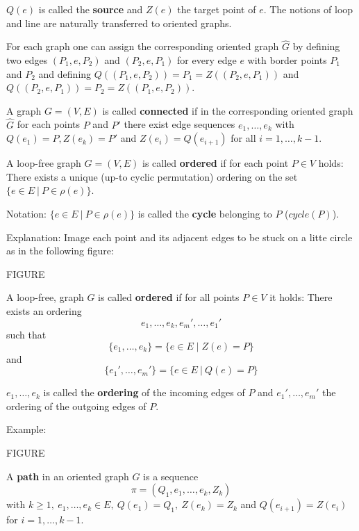 $Q(e)$ is called the {\bf source} and $Z(e)$ the target point of $e$. The
notions of loop and line are naturally transferred to oriented graphs.

For each graph one can assign the corresponding oriented graph $\hat{G}$ by
defining two edges $(P_1,e,P_2)$ and $(P_2,e,P_1)$ for every edge $e$ with border points
$P_1$ and $P_2$ and defining $Q((P_1,e,P_2)) = P_1 = Z((P_2,e,P_1))$ and
$Q((P_2,e,P_1)) = P_2 = Z((P_1,e,P_2))$.

\begin{definition}
A graph $G = (V,E)$ is called {\bf connected} if in the corresponding oriented
graph $\hat{G}$ for each points $P$ and $P'$ there exist edge sequences $e_1,
\ldots, e_k$ with $Q(e_1) = P, Z(e_k) = P'$ and $Z(e_i) = Q(e_{i+1})$ for all
$i = 1, \ldots, k-1$.
\end{definition}

\begin{definition}
A loop-free graph $G = (V,E)$ is called {\bf ordered} if for each point $P \in
V$ holds: There exists a unique (up-to cyclic permutation) ordering on the set
$\{ e \in E \ |\ P \in \rho(e) \}$.
\end{definition}

Notation: $\{ e \in E \ |\ P \in \rho(e) \}$ is called the {\bf cycle} belonging
to $P$ ($cycle(P)$).

Explanation: Image each point and its adjacent edges to be stuck on a litte
circle as in the following figure:

FIGURE

\begin{definition}
A loop-free, graph $G$ is called {\bf ordered} if for all points
$P \in V$ it	holds: There exists an ordering 
\[ e_1, \ldots, e_k, e_m', \ldots, e_1'\]
such that
\[ \{ e_1, \ldots, e_k \} = \{ e \in E \mid Z(e) = P \} \]
and 
\[ \{ e_1', \ldots, e_m' \} = \{ e \in E\ |\ Q(e) = P \} \]
\end{definition}

$e_1, \ldots, e_k$ is called the {\bf ordering} of the incoming edges of $P$ and
$e_1', \ldots, e_m'$ the ordering of the outgoing edges of $P$.

Example:

FIGURE

\begin{definition}[path]
A {\bf path} in an oriented graph $G$ is a sequence 
\[ \pi = (Q_1, e_1, \ldots, e_k, Z_k) \]
with $k \geq 1,\ e_1, \ldots, e_k \in E,\ Q(e_1) = Q_1,\ Z(e_k)=Z_k$ and
$Q(e_{i+1}) = Z(e_i)$ for $i = 1, \ldots, k-1$.
\end{definition}

